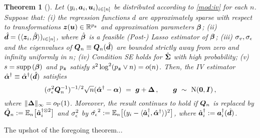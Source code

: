 \documentclass{uwstat572}
\newcommand{\benn}{\begin{equation*}}
\newcommand{\eenn}{\end{equation*}}
\newtheorem{thm}{Theorem}[section]
\theoremstyle{definition}
\theoremstyle{remark}
\newcommand{\R}{\ensuremath{\mathbb{R}}}
\newcommand{\Id}{\bs{I}}
\newcommand{\supp}{\mathrm{supp} \,}
\newcommand{\Prb}{\mathrm{P}}
\newcommand{\Ex}{\mathbb{E}}
\newcommand{\Exn}{\Ex_n}
\newcommand{\Normal}{\mathrm{N}}
\newcommand{\bs}[1]{\boldsymbol{#1}}
\numberwithin{equation}{section}
\begin{document}
\begin{thm}[{\cite[Theorem 3]{BCH11}}]
Let $(y_i, \a_i, \u_i)_{i\inn}$ be distributed according to \eqref{mod:iv} for each $n$. Suppose that: (i) the regression functions $d$ are approximately sparse with respect to transformations $\z(\u) \in \R^{\pz}$ and approximation parameters $\regb$; (ii) $\dhat = (\langle \z_i,\regbh\rangle)_{i\inn}$, where $\regbh$ is a feasible (Post-) Lasso estimator of $\regb$; (iii) $\sigma_v, \sigma_\epsilon$ and the eigenvalues of $\Qn \equiv \Qn(\dhat)$ are bounded strictly away from zero and infinity uniformly in $n$; (iv) Condition SE holds for $\gramhat$ with high probability; (v) $s = \supp(\regb)$ and $\pz$ satisfy $\sb^2\log^2(\pz\vee n) = o(n)$. Then, the IV estimator $\regaiv \equiv \regaiv(\dhat)$ satisfies
\benn
	(\sds^2\Qn^{-1})^{-1/2} \sqrt{n}(\regaiv-\rega) \ = \ \g + \rm\,, \qquad \g \ \sim \ \Normal(\bs{0}, \Id) \,,
\eenn
where $\|\rm\|_\infty = o_\Prb(1)$. Moreover, the result continues to hold if $\Qn$ is replaced by $\Qnhat := \Exn\big[\ainstihatkpt\big]$ and $\sigma_\epsilon^2$ by $\sdshat^2 := \Exn\big[(y_i -\langle \ainstihat, \regaiv\rangle)^2\big]$, where $\ainstihat := \ainsti(\dhat)$. 
\end{thm}

The upshot of the foregoing theorem... 
\end{document}
